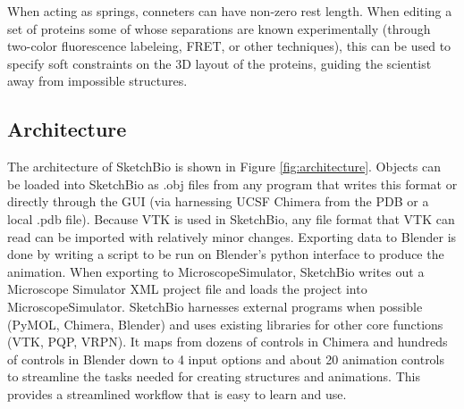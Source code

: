 \documentclass[twocolumn]{bmcart}%
\begin{document}
When acting as springs, conneters can have non-zero rest length.  When editing a set of proteins some of whose separations are known experimentally (through two-color fluorescence labeleing, FRET, or other techniques), this can be used to specify soft constraints on the 3D layout of the proteins, guiding the scientist away from impossible structures.

\subsection*{Architecture}

The architecture of SketchBio is shown in Figure \ref{fig:architecture}.  Objects can be loaded into SketchBio as .obj files from any program that writes this format or directly through the GUI (via harnessing UCSF Chimera from the PDB or a local .pdb file).  Because VTK is used in SketchBio, any file format that VTK can read can be imported with relatively minor changes.  Exporting data to Blender is done by writing a script to be run on Blender's python interface to produce the animation.  When exporting to MicroscopeSimulator, SketchBio writes out a Microscope Simulator XML project file and loads the project into MicroscopeSimulator.  SketchBio harnesses external programs when possible (PyMOL, Chimera, Blender) and uses existing libraries for other core functions (VTK, PQP, VRPN).  It maps from dozens of controls in Chimera and hundreds of controls in Blender down to 4 input options and about 20 animation controls to streamline the tasks needed for creating structures and animations.  This provides a streamlined workflow that is easy to learn and use.
\end{document}
